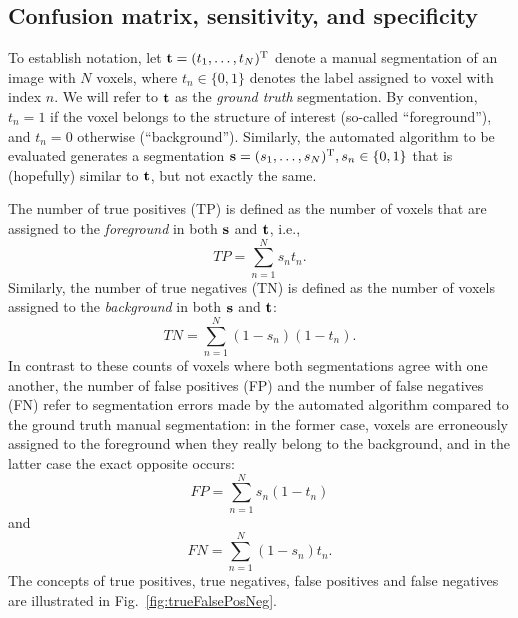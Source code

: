 \documentclass[10pt,twoside]{book}
\begin{document}
\subsection{Confusion matrix, sensitivity, and specificity}

To establish notation, let $\mathbf{t} = ( t_1, \ldots, t_N )^\mathrm{T}$ denote a manual segmentation of an image with $N$ voxels, where
$t_n \in \{0,1\}$ denotes the label assigned to voxel with index $n$. 
We will refer to $\mathbf{t}$ as the \emph{ground truth} segmentation.
By convention, $t_n=1$ if the voxel belongs to the structure of interest (so-called ``foreground''),
and $t_n=0$ otherwise (``background''). Similarly, the automated algorithm to be evaluated generates a segmentation $\mathbf{s} = (s_1, \ldots, s_N )^\mathrm{T}, s_n \in \{0,1\}$
that is (hopefully) similar to $\mathbf{t}$, but not exactly the same.

The number of true positives (TP) is defined as the number of voxels that are assigned to the \emph{foreground} in both $\mathbf{s}$ and $\mathbf{t}$, i.e.,
\begin{equation}
  TP = \sum_{n=1}^N s_n t_n.
  \label{eq:TP}
\end{equation}
Similarly, the number of true negatives (TN) is defined as the number of voxels assigned to the \emph{background} in both $\mathbf{s}$ and
 $\mathbf{t}$:
\begin{equation}
  TN = \sum_{n=1}^N (1-s_n)(1-t_n).
  \label{eq:TN}
\end{equation}
In contrast to these counts of voxels where both segmentations agree with one another, the number of false positives (FP) and the number of false negatives (FN) refer to segmentation errors made by the automated algorithm compared
to the ground truth manual segmentation: in the former case, voxels are erroneously assigned to the foreground when they really belong to the background, and in the latter case the exact opposite occurs:
\begin{equation}
  FP = \sum_{n=1}^N s_n (1-t_n)
  \label{eq:FP}
\end{equation}
and 
\begin{equation}
  FN = \sum_{n=1}^N (1-s_n) t_n.
  \label{eq:FN}
\end{equation}
The concepts of true positives, true negatives, false positives and false negatives are illustrated in Fig.~\ref{fig:trueFalsePosNeg}.
\end{document}
